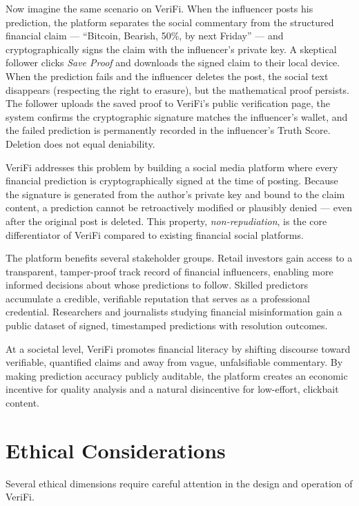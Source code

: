 \documentclass[a4paper,12pt]{report}
\begin{document}
Now imagine the same scenario on VeriFi. When the influencer posts his prediction, the platform separates the social commentary from the structured financial claim --- ``Bitcoin, Bearish, 50\%, by next Friday'' --- and cryptographically signs the claim with the influencer's private key. A skeptical follower clicks \textit{Save Proof} and downloads the signed claim to their local device. When the prediction fails and the influencer deletes the post, the social text disappears (respecting the right to erasure), but the mathematical proof persists. The follower uploads the saved proof to VeriFi's public verification page, the system confirms the cryptographic signature matches the influencer's wallet, and the failed prediction is permanently recorded in the influencer's Truth Score. Deletion does not equal deniability.

VeriFi addresses this problem by building a social media platform where every financial prediction is cryptographically signed at the time of posting. Because the signature is generated from the author's private key and bound to the claim content, a prediction cannot be retroactively modified or plausibly denied --- even after the original post is deleted. This property, \textit{non-repudiation}, is the core differentiator of VeriFi compared to existing financial social platforms.

The platform benefits several stakeholder groups. Retail investors gain access to a transparent, tamper-proof track record of financial influencers, enabling more informed decisions about whose predictions to follow. Skilled predictors accumulate a credible, verifiable reputation that serves as a professional credential. Researchers and journalists studying financial misinformation gain a public dataset of signed, timestamped predictions with resolution outcomes.

At a societal level, VeriFi promotes financial literacy by shifting discourse toward verifiable, quantified claims and away from vague, unfalsifiable commentary. By making prediction accuracy publicly auditable, the platform creates an economic incentive for quality analysis and a natural disincentive for low-effort, clickbait content.

\section{Ethical Considerations}

Several ethical dimensions require careful attention in the design and operation of VeriFi.
\end{document}
